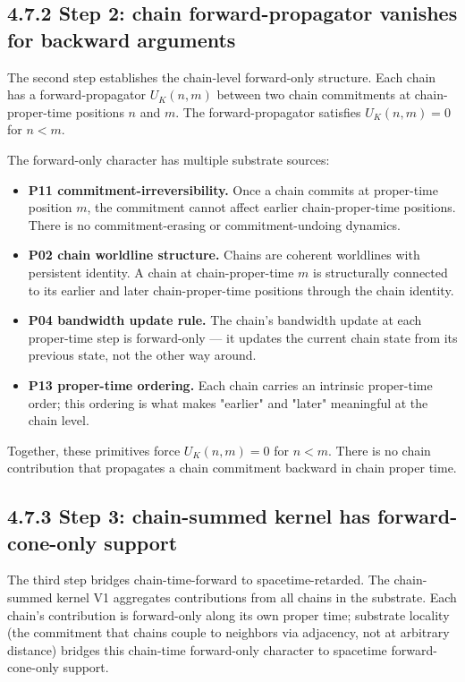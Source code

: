 \documentclass[11pt]{book}
\begin{document}
\subsection{4.7.2 Step 2: chain forward-propagator vanishes for backward arguments}

The second step establishes the chain-level forward-only structure. Each chain has a forward-propagator $U_K(n,m)$ between two chain commitments at chain-proper-time positions $n$ and $m$. The forward-propagator satisfies $U_K(n,m) = 0$ for $n < m$.

The forward-only character has multiple substrate sources:
\begin{itemize}
\item \textbf{P11 commitment-irreversibility.} Once a chain commits at proper-time position $m$, the commitment cannot affect earlier chain-proper-time positions. There is no commitment-erasing or commitment-undoing dynamics.
\item \textbf{P02 chain worldline structure.} Chains are coherent worldlines with persistent identity. A chain at chain-proper-time $m$ is structurally connected to its earlier and later chain-proper-time positions through the chain identity.
\item \textbf{P04 bandwidth update rule.} The chain's bandwidth update at each proper-time step is forward-only — it updates the current chain state from its previous state, not the other way around.
\item \textbf{P13 proper-time ordering.} Each chain carries an intrinsic proper-time order; this ordering is what makes "earlier" and "later" meaningful at the chain level.
\end{itemize}

Together, these primitives force $U_K(n,m) = 0$ for $n < m$. There is no chain contribution that propagates a chain commitment backward in chain proper time.

\subsection{4.7.3 Step 3: chain-summed kernel has forward-cone-only support}

The third step bridges chain-time-forward to spacetime-retarded. The chain-summed kernel V1 aggregates contributions from all chains in the substrate. Each chain's contribution is forward-only along its own proper time; substrate locality (the commitment that chains couple to neighbors via adjacency, not at arbitrary distance) bridges this chain-time forward-only character to spacetime forward-cone-only support.
\end{document}
